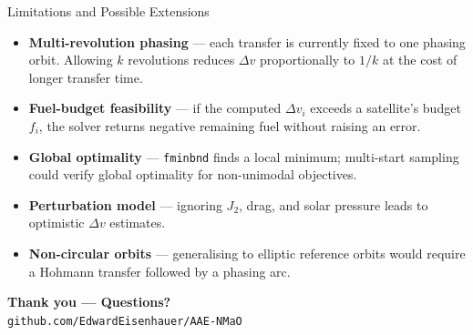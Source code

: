 \documentclass[aspectratio=169, 10pt]{beamer}
\newcommand{\dv}{\Delta v}
\begin{document}
\begin{frame}{Limitations and Possible Extensions}
  \begin{itemize}[<+->]
    \item \textbf{Multi-revolution phasing} --- each transfer is currently
          fixed to one phasing orbit. Allowing $k$ revolutions reduces $\dv$
          proportionally to $1/k$ at the cost of longer transfer time.
    \item \textbf{Fuel-budget feasibility} --- if the computed $\dv_i$
          exceeds a satellite's budget $f_i$, the solver returns negative
          remaining fuel without raising an error.
    \item \textbf{Global optimality} --- \texttt{fminbnd} finds a local
          minimum; multi-start sampling could verify global optimality for
          non-unimodal objectives.
    \item \textbf{Perturbation model} --- ignoring $J_2$, drag, and solar
          pressure leads to optimistic $\dv$ estimates.
    \item \textbf{Non-circular orbits} --- generalising to elliptic reference
          orbits would require a Hohmann transfer followed by a phasing arc.
  \end{itemize}
\end{frame}

\begin{frame}{}
  \begin{center}
    \Large\textbf{Thank you --- Questions?}\\[6pt]
    \normalsize\texttt{github.com/EdwardEisenhauer/AAE-NMaO}
  \end{center}
\end{frame}
\end{document}
